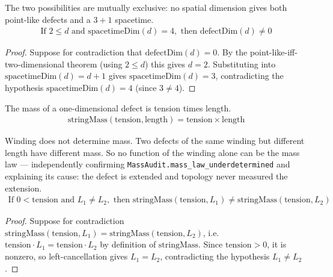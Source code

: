 \begin{theorem}
The two possibilities are mutually exclusive: no spatial dimension gives both point-like defects and a $3+1$ spacetime.
\begin{align*}
\text{If } 2 \le d \text{ and } \text{spacetimeDim}(d) = 4, \text{ then } \text{defectDim}(d) \neq 0
\end{align*}
\begin{proof}
Suppose for contradiction that $\text{defectDim}(d)=0$. By the point-like-iff-two-dimensional theorem (using $2\leq d$) this gives $d=2$. Substituting into $\text{spacetimeDim}(d)=d+1$ gives $\text{spacetimeDim}(d)=3$, contradicting the hypothesis $\text{spacetimeDim}(d)=4$ (since $3\neq4$).
\end{proof}
\end{theorem}

\begin{definition}
The mass of a one-dimensional defect is tension times length.
\begin{align*}
\text{stringMass}(\text{tension}, \text{length}) = \text{tension} \times \text{length}
\end{align*}
\end{definition}

\begin{theorem}
Winding does not determine mass.  Two defects of the same winding but different length have different mass.  So no function of the winding alone can be the mass law — independently confirming \texttt{MassAudit.mass\_law\_underdetermined} and explaining its cause: the defect is extended and topology never measured the extension.
\begin{align*}
\text{If } 0 < \text{tension} \text{ and } L_1 \neq L_2, \text{ then } \text{stringMass}(\text{tension}, L_1) \neq \text{stringMass}(\text{tension}, L_2)
\end{align*}
\begin{proof}
Suppose for contradiction $\text{stringMass}(\text{tension},L_1)=\text{stringMass}(\text{tension},L_2)$, i.e.\ $\text{tension}\cdot L_1 = \text{tension}\cdot L_2$ by definition of $\text{stringMass}$. Since $\text{tension}>0$, it is nonzero, so left-cancellation gives $L_1=L_2$, contradicting the hypothesis $L_1\neq L_2$.
\end{proof}
\end{theorem}

